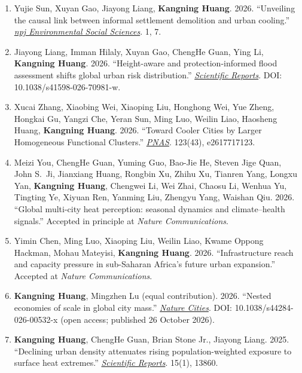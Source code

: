 \documentclass[11pt,letterpaper]{article}
\begin{document}
\begin{enumerate}
  \item Yujie Sun, Xuyan Gao, Jiayong Liang, \textbf{Kangning Huang}. 2026. ``Unveiling the causal link between informal settlement demolition and urban cooling.'' \href{https://doi.org/10.1038/s44432-026-00009-1}{\textit{npj Environmental Social Sciences}}. 1, 7.

  \item Jiayong Liang, Imman Hilaly, Xuyan Gao, ChengHe Guan, Ying Li, \textbf{Kangning Huang}. 2026. ``Height-aware and protection-informed flood assessment shifts global urban risk distribution.'' \href{https://www.nature.com/articles/s41598-026-70981-w}{\textit{Scientific Reports}}. DOI: 10.1038/s41598-026-70981-w.

  \item Xucai Zhang, Xiaobing Wei, Xiaoping Liu, Honghong Wei, Yue Zheng, Hongkai Gu, Yangzi Che, Yeran Sun, Ming Luo, Weilin Liao, Haosheng Huang, \textbf{Kangning Huang}. 2026. ``Toward Cooler Cities by Larger Homogeneous Functional Clusters.'' \href{https://doi.org/10.1073/pnas.2617717123}{\textit{PNAS}}. 123(43), e2617717123.
  \item Meizi You, ChengHe Guan, Yuming Guo, Bao-Jie He, Steven Jige Quan, John S.\ Ji, Jianxiang Huang, Rongbin Xu, Zhihu Xu, Tianren Yang, Longxu Yan, \textbf{Kangning Huang}, Chengwei Li, Wei Zhai, Chaosu Li, Wenhua Yu, Tingting Ye, Xiyuan Ren, Yanming Liu, Zhengyu Yang, Waishan Qiu. 2026. ``Global multi-city heat perception: seasonal dynamics and climate--health signals.'' Accepted in principle at \textit{Nature Communications}.

  \item Yimin Chen, Ming Luo, Xiaoping Liu, Weilin Liao, Kwame Oppong Hackman, Mohau Mateyisi, \textbf{Kangning Huang}. 2026. ``Infrastructure reach and capacity pressure in sub-Saharan Africa's future urban expansion.'' Accepted at \textit{Nature Communications}.

  \item \textbf{Kangning Huang}, Mingzhen Lu (equal contribution). 2026. ``Nested economies of scale in global city mass.'' \href{https://doi.org/10.1038/s44284-026-00532-x}{\textit{Nature Cities}}. DOI: 10.1038/s44284-026-00532-x (open access; published 26 October 2026).

  \item \textbf{Kangning Huang}, ChengHe Guan, Brian Stone Jr., Jiayong Liang. 2025. ``Declining urban density attenuates rising population-weighted exposure to surface heat extremes.'' \href{https://www.nature.com/articles/s41598-025-96045-z}{\textit{Scientific Reports}}. 15(1), 13860.


\end{enumerate}
\end{document}
